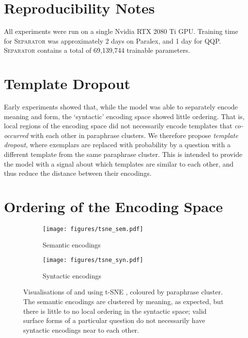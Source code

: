 \documentclass[11pt,a4paper]{article}
\begin{document}
\section{Reproducibility Notes}
\label{sec:reproducibility}

All experiments were run on a single Nvidia RTX 2080 Ti GPU. Training time for \textsc{Separator} was approximately 2 days on Paralex, and 1 day for QQP. \textsc{Separator} contains a total of 69,139,744 trainable parameters.



\section{Template Dropout}
\label{sec:templatedropout}

Early experiments showed that, while the model was able to separately encode meaning and form, the `syntactic' encoding space showed little ordering. That is, local regions of the encoding space did not necessarily encode templates that \textit{co-occurred} with each other in paraphrase clusters. We therefore propose \textit{template dropout}, where exemplars  are replaced with  probability  by a question with a different template from the same paraphrase cluster. This is intended to provide the model with a signal about which templates are similar to each other, and thus reduce the distance between their encodings.

\section{Ordering of the Encoding Space}
\label{sec:ordering}



\begin{figure}[!t]
    \centering
    \begin{subfigure}[b]{0.4\textwidth}
         \centering
         \texttt{[image: figures/tsne\_sem.pdf]}
         \caption{Semantic encodings}
         \label{fig:tsne_sem}
     \end{subfigure}
\begin{subfigure}[b]{0.4\textwidth}
         \centering
         \texttt{[image: figures/tsne\_syn.pdf]}
         \caption{Syntactic encodings}
         \label{fig:tsne_syn}
     \end{subfigure}
    \caption{Visualisations of  and  using t-SNE \cite{tsne}, coloured by paraphrase cluster. The semantic encodings are clustered by meaning, as expected, but there is little to no local ordering in the syntactic space; valid surface forms of a particular question do not necessarily have  syntactic encodings near to each other.}
    \label{fig:tsne}
\end{figure}
\end{document}
